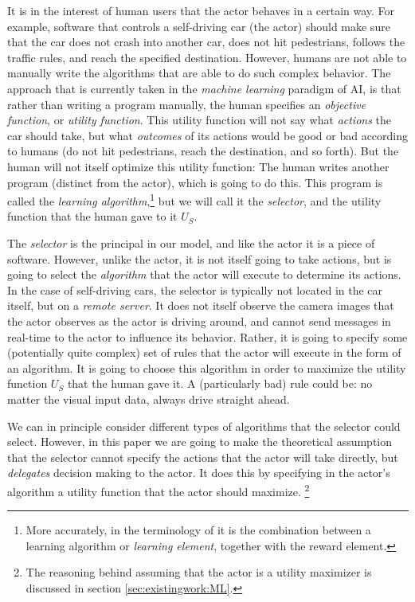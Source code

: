 It is in the interest of human users that the actor behaves in a certain way. For example, software that controls a self-driving car (the actor) should make sure that the car does not crash into another car, does not hit pedestrians, follows the traffic rules, and reach the specified destination. However, humans are not able to manually write the algorithms that are able to do such complex behavior. The approach that is currently taken in the \textit{machine learning} paradigm of AI, is that rather than writing a program manually, the human specifies an \textit{objective function}, or \textit{utility function}. This utility function will not say what \textit{actions} the car should take, but what \textit{outcomes} of its actions would be good or bad according to humans (do not hit pedestrians, reach the destination, and so forth). But the human will not itself optimize this utility function: The human writes another program (distinct from the actor), which is going to do this. This program is called the \textit{learning algorithm},\footnote{More accurately, in the terminology of \cite{Russell2010} it is the combination between a learning algorithm or \textit{learning element}, together with the reward element.} but we will call it the \textit{selector}, and the utility function that the human gave to it $U_S$.

The \textit{selector} is the principal in our model, and like the actor it is a piece of software. However, unlike the actor, it is not itself going to take actions, but is going to select the \textit{algorithm} that the actor will execute to determine its actions. In the case of self-driving cars, the selector is typically not located in the car itself, but on a \textit{remote server}. It does not itself observe the camera images that the actor observes as the actor is driving around, and cannot send messages in real-time to the actor to influence its behavior. Rather, it is going to specify some (potentially quite complex) set of rules that the actor will execute in the form of an algorithm. It is going to choose this algorithm in order to maximize the utility function $U_S$ that the human gave it. A (particularly bad) rule could be: no matter the visual input data, always drive straight ahead. 

We can in principle consider different types of algorithms that the selector could select. However, in this paper we are going to make the theoretical assumption that the selector cannot specify the actions that the actor will take directly, but \textit{delegates} decision making to the actor. It does this by specifying in the actor's algorithm a utility function that the actor should maximize. \footnote{The reasoning behind assuming that the actor is a utility maximizer is discussed in section \ref{sec:existingwork:ML}. }




